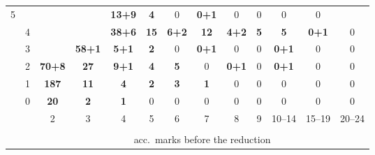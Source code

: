 \begin{tabular}{cc|ccccccccccc|}
5
 & 
\footnotesize{}
 & 
\footnotesize{}
 & 
\footnotesize{}
 & 
\footnotesize{\cellcolor{blue!12}\textbf{13+9}}
 & 
\footnotesize{\cellcolor{blue!6}\textbf{4}}
 & 
\footnotesize{0}
 & 
\footnotesize{\cellcolor{blue!5}\textbf{0+1}}
 & 
\footnotesize{0}
 & 
\footnotesize{0}
 & 
\footnotesize{0}
 & 
\footnotesize{0}
\\
 & 
4
 & 
\footnotesize{}
 & 
\footnotesize{}
 & 
\footnotesize{\cellcolor{blue!19}\textbf{38+6}}
 & 
\footnotesize{\cellcolor{blue!10}\textbf{15}}
 & 
\footnotesize{\cellcolor{blue!7}\textbf{6+2}}
 & 
\footnotesize{\cellcolor{blue!9}\textbf{12}}
 & 
\footnotesize{\cellcolor{blue!7}\textbf{4+2}}
 & 
\footnotesize{\cellcolor{blue!6}\textbf{5}}
 & 
\footnotesize{\cellcolor{blue!6}\textbf{5}}
 & 
\footnotesize{\cellcolor{blue!5}\textbf{0+1}}
 & 
\footnotesize{0}
\\
 & 
3
 & 
\footnotesize{}
 & 
\footnotesize{\cellcolor{blue!24}\textbf{58+1}}
 & 
\footnotesize{\cellcolor{blue!7}\textbf{5+1}}
 & 
\footnotesize{\cellcolor{blue!5}\textbf{2}}
 & 
\footnotesize{0}
 & 
\footnotesize{\cellcolor{blue!5}\textbf{0+1}}
 & 
\footnotesize{0}
 & 
\footnotesize{0}
 & 
\footnotesize{\cellcolor{blue!5}\textbf{0+1}}
 & 
\footnotesize{0}
 & 
\footnotesize{0}
\\
 & 
2
 & 
\footnotesize{\cellcolor{blue!31}\textbf{70+8}}
 & 
\footnotesize{\cellcolor{blue!14}\textbf{27}}
 & 
\footnotesize{\cellcolor{blue!8}\textbf{9+1}}
 & 
\footnotesize{\cellcolor{blue!6}\textbf{4}}
 & 
\footnotesize{\cellcolor{blue!6}\textbf{5}}
 & 
\footnotesize{0}
 & 
\footnotesize{\cellcolor{blue!5}\textbf{0+1}}
 & 
\footnotesize{0}
 & 
\footnotesize{\cellcolor{blue!5}\textbf{0+1}}
 & 
\footnotesize{0}
 & 
\footnotesize{0}
\\
 & 
1
 & 
\footnotesize{\cellcolor{blue!67}\textcolor{black!10}{\textbf{187}}}
 & 
\footnotesize{\cellcolor{blue!8}\textbf{11}}
 & 
\footnotesize{\cellcolor{blue!6}\textbf{4}}
 & 
\footnotesize{\cellcolor{blue!5}\textbf{2}}
 & 
\footnotesize{\cellcolor{blue!6}\textbf{3}}
 & 
\footnotesize{\cellcolor{blue!5}\textbf{1}}
 & 
\footnotesize{0}
 & 
\footnotesize{0}
 & 
\footnotesize{0}
 & 
\footnotesize{0}
 & 
\footnotesize{0}
\\
 & 
0
 & 
\footnotesize{\cellcolor{blue!11}\textbf{20}}
 & 
\footnotesize{\cellcolor{blue!5}\textbf{2}}
 & 
\footnotesize{\cellcolor{blue!5}\textbf{1}}
 & 
\footnotesize{0}
 & 
\footnotesize{0}
 & 
\footnotesize{0}
 & 
\footnotesize{0}
 & 
\footnotesize{0}
 & 
\footnotesize{0}
 & 
\footnotesize{0}
 & 
\footnotesize{0}
\\
\cline{3-13}
\multicolumn{2}{c}{}
 & 
2
 & 
3
 & 
4
 & 
5
 & 
6
 & 
7
 & 
8
 & 
9
 & 
10--14
 & 
15--19
 & 
\multicolumn{1}{c}{20--24}

\\
\vspace{-10pt}\\
\multicolumn{2}{c}{} & \multicolumn{11}{c}{acc.~marks before the reduction} \\
\end{tabular}


